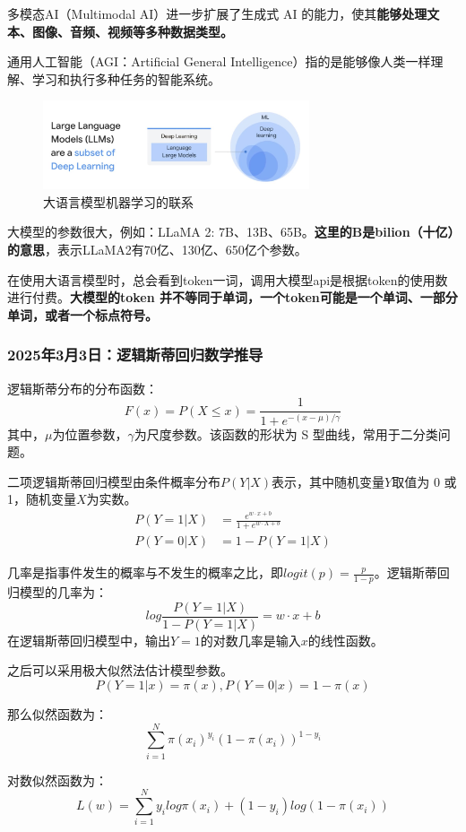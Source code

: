 \documentclass[12pt]{article}
\begin{document}
多模态AI（Multimodal AI）进一步扩展了生成式 AI 的能力，使其\textbf{能够处理文本、图像、音频、视频等多种数据类型。}

通用人工智能（AGI：Artificial General Intelligence）指的是能够像人类一样理解、学习和执行多种任务的智能系统。

\begin{figure}[h]
    \centering
    \includegraphics[width=0.7\textwidth]{./images/llmML.png}
    \caption*{大语言模型机器学习的联系}
\end{figure}
大模型的参数很大，例如：LLaMA 2: 7B、13B、65B。\textbf{这里的B是bilion（十亿）的意思}，表示LLaMA2有70亿、130亿、650亿个参数。

在使用大语言模型时，总会看到token一词，调用大模型api是根据token的使用数进行付费。\textbf{大模型的token 并不等同于单词，一个token可能是一个单词、一部分单词，或者一个标点符号。}

\subsubsection{2025年3月3日：逻辑斯蒂回归数学推导}
逻辑斯蒂分布的分布函数：
$$F(x) = P(X \le x) = \frac{1}{1 + e^{-(x - \mu) / \gamma}}$$
其中，$\mu$为位置参数，$\gamma$为尺度参数。该函数的形状为 S 型曲线，常用于二分类问题。

二项逻辑斯蒂回归模型由条件概率分布$P(Y|X)$表示，其中随机变量$Y$取值为 0 或 1，随机变量$X$为实数。
\begin{align}
    P(Y=1|X) &= \frac{ e^{w \cdot x + b} }{1 + e^{w \cdot X + b}} \\
    P(Y=0|X) &= 1 - P(Y=1|X)
\end{align}

几率是指事件发生的概率与不发生的概率之比，即$logit(p) = \frac{p}{1-p}$。逻辑斯蒂回归模型的几率为：
$$
log \frac{P(Y=1|X)}{1 - P(Y=1|X)} = w \cdot x + b
$$
在逻辑斯蒂回归模型中，输出$Y=1$的对数几率是输入$x$的线性函数。

之后可以采用极大似然法估计模型参数。
$$
P(Y=1|x) = \pi(x), P(Y=0|x) = 1 - \pi(x)
$$

那么似然函数为：
$$
\sum_{i=1}^{N} \pi(x_i)^{y_i} (1 - \pi(x_i))^{1-y_i}
$$

对数似然函数为：
$$
L(w) = \sum_{i=1}^{N} y_i log \pi(x_i) + (1 - y_i) log (1 - \pi(x_i))
$$
\end{document}
